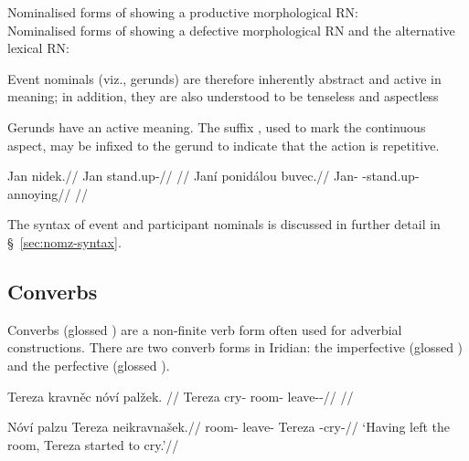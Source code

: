 \pex \a Nominalised forms of  showing a productive morphological RN:\smallskip\\
\a Nominalised forms of  showing a defective morphological RN and the alternative lexical RN:\smallskip\\
	\xe


Event nominals (viz., gerunds) are therefore inherently abstract and active in meaning; in addition, they are also understood to be tenseless and aspectless

Gerunds have an active meaning. The suffix , used to mark the continuous aspect, may be infixed to the gerund to indicate that the action is repetitive.

\pex
\a
\begingl
\gla Jan nidek.//
\glb Jan stand.up-//
\glft {}//
\endgl
\a
\begingl
\gla Janí ponidálou buvec.//
\glb Jan-\Gen{} -stand.up- annoying//
\glft {}//
\endgl
\xe

The syntax of event and participant nominals is discussed in further detail in \S~\ref{sec:nomz-syntax}.

\subsection{Converbs}
Converbs (glossed \Cv{}) are a non-finite verb form often used for adverbial constructions. There are two converb forms in Iridian: the imperfective  (glossed ) and the perfective  (glossed ).

\pex
\begingl
\gla Tereza kravn\v{e}c nóví palžek. //
\glb Tereza cry- room-\Gen{} leave-\Av{}-\Pf{}//
\glft {}//
\endgl
\xe

\pex
\begingl
\gla Nóví palzu Tereza neikravnašek.//
\glb room-\Gen{} leave- Tereza -cry-//
\glft `Having left the room, Tereza started to cry.'//
\endgl
\xe

